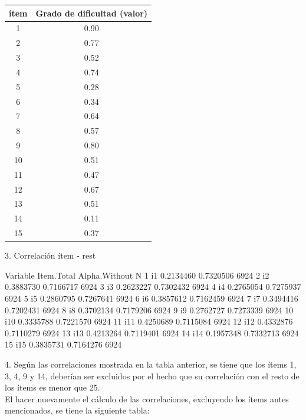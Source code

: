 \documentclass{article}
\begin{document}
\begin{center}
 \begin{tabular}{||c c||} 
 \hline
 ítem & Grado de dificultad (valor) \\ [0.5ex] 
 \hline\hline
 1 &   0.90 \\ 
 \hline
 2 & 0.77  \\
 \hline
 3 & 0.52  \\
 \hline
 4 & 0.74 \\
 \hline
  5 & 0.28 \\
 \hline
  6 & 0.34 \\
 \hline
  7 & 0.64 \\
 \hline
  8 & 0.57 \\
 \hline
  9 & 0.80 \\
 \hline
  10 & 0.51 \\
 \hline
  11 & 0.47 \\
 \hline
  12 & 0.67 \\
 \hline
  13 & 0.51 \\
 \hline
  14 & 0.11 \\
 \hline
  15 & 0.37 \\
 \hline
\end{tabular}
\end{center}

3. Correlación ítem - rest

\begin{Schunk}
\begin{Soutput}
   Variable Item.Total Alpha.Without    N
1        i1  0.2134460     0.7320506 6924
2        i2  0.3883730     0.7166717 6924
3        i3  0.2623227     0.7302432 6924
4        i4  0.2765054     0.7275937 6924
5        i5  0.2860795     0.7267641 6924
6        i6  0.3857612     0.7162459 6924
7        i7  0.3494416     0.7202431 6924
8        i8  0.3702134     0.7179206 6924
9        i9  0.2762727     0.7273339 6924
10      i10  0.3335788     0.7221570 6924
11      i11  0.4250689     0.7115084 6924
12      i12  0.4332876     0.7110279 6924
13      i13  0.4213264     0.7119401 6924
14      i14  0.1957348     0.7332713 6924
15      i15  0.3835731     0.7164276 6924
\end{Soutput}
\end{Schunk}

4. Según las correlaciones mostrada en la tabla anterior, se tiene que los ítems 1, 3, 4, 9 y 14, deberían  ser excluidos por el hecho que su correlación con el resto de los ítems es menor que 25.\\
El hacer nuevamente el cálculo de las correlaciones, excluyendo los ítems antes mencionados, se tiene la siguiente tabla:
\end{document}
